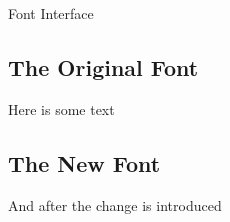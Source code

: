 \begin{ExampleBlock}{Font Interface}
\subsection{The Original Font}
    Here is some text


\subsection{The New Font}
    And after the change is introduced


\end{ExampleBlock}
